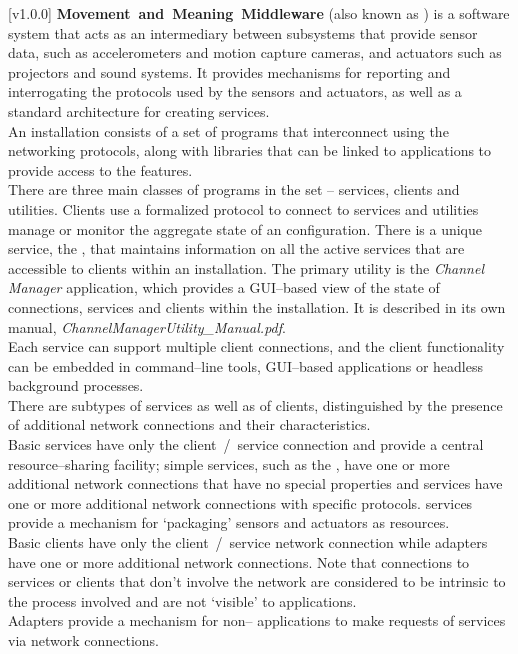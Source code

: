 [v1.0.0]
\textbf{Movement~and~Meaning~Middleware} (also known as \mplusm{}) is a software system
that acts as an intermediary between subsystems that provide sensor data, such as
accelerometers and motion capture cameras, and actuators such as projectors and sound
systems.
It provides mechanisms for reporting and interrogating the protocols used by the sensors
and actuators, as well as a standard architecture for creating services.\\

An \mplusm{} installation consists of a set of programs that interconnect using the
 networking
protocols, along with libraries that can be linked to applications to provide access to
the \mplusm{} features.\\

There are three main classes of programs in the set -- services, clients and utilities.
Clients use a formalized protocol to connect to services and utilities manage or monitor
the aggregate state of an \mplusm{} configuration.
There is a unique service, the , that
maintains information on all the active services that are accessible to clients within an
\mplusm{} installation.
The primary utility is the \emph{Channel Manager} application, which provides a
GUI--based view of the state of connections, services and clients within the
installation.
It is described in its own manual, \emph{ChannelManagerUtility\_Manual.pdf}.\\

Each service can support multiple client connections, and the client functionality can be
embedded in command--line tools, GUI--based applications or headless background
processes.\\

There are subtypes of services as well as of clients, distinguished by the presence of
additional \yarp{} network connections and their characteristics.\\

Basic services have only the client~/~service \yarp{} connection and provide a central
resource--sharing facility; simple services, such as the
, have one or more additional \yarp{}
network connections that have no special properties and  services have one
or more additional \yarp{} network connections with specific protocols.
 services provide a mechanism for `packaging' sensors and actuators as
\mplusm{} resources.\\

Basic clients have only the client~/~service \yarp{} network connection while adapters
have one or more additional \yarp{} network connections.
Note that connections to services or clients that don't involve the \yarp{} network are
considered to be intrinsic to the process involved and are not `visible' to \mplusm{}
applications.\\

Adapters provide a mechanism for non--\mplusm{} applications to make requests of \mplusm{}
services via \yarp{} network connections.
\primaryEnd{}
